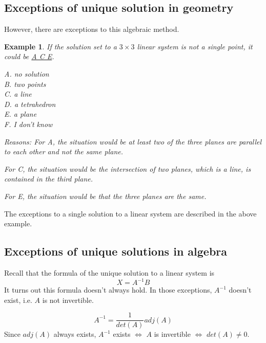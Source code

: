 \documentclass{article}
\newtheorem{example}{Example}
\begin{document}
\subsection{Exceptions of unique solution in geometry}

However, there are exceptions to this algebraic method.
\begin{example}
  If the solution set to a $3 \times 3$ linear system is not a single point, it 
  could be \underline{A C E}.

  A. no solution \\
  B. two points \\
  C. a line \\
  D. a tetrahedron \\
  E. a plane \\
  F. I don't know

  Reasons:
  For A, the situation would be at least two of the three planes are parallel to 
  each other and not the same plane.

  For C, the situation would be the intersection of two planes, which is a line, 
  is contained in the third plane.

  For E, the situation would be that the three planes are the same.
\end{example}
The exceptions to a single solution to a linear system are described in the 
above example.

\subsection{Exceptions of unique solutions in algebra}

Recall that the formula of the unique solution to a linear system is
\[
  X = A^{-1}B
\]
It turns out this formula doesn't always hold. In those exceptions, $A^{-1}$ 
doesn't exist, i.e. $A$ is not invertible.

\[
  A^{-1} = \frac{1}{det(A)}adj(A)
\]
Since $adj(A)$ always exists, $A^{-1}$ exists $\iff$ $A$ is invertible $\iff$ 
$det(A) \neq 0$.
\end{document}
